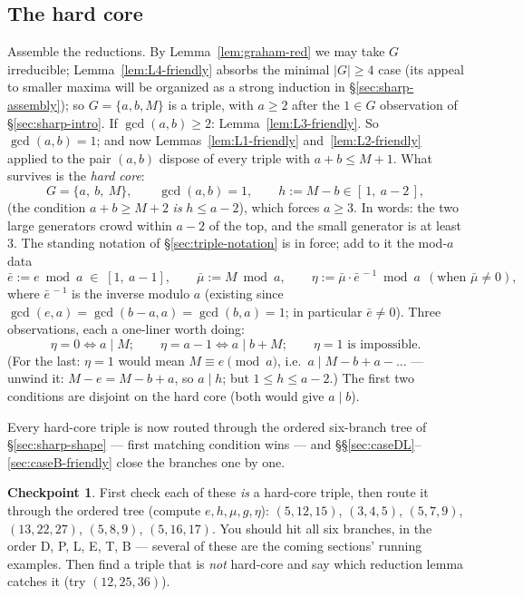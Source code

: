 \documentclass[11pt,reqno]{amsart}
\theoremstyle{plain}
\theoremstyle{definition}
\newtheorem{checkpoint}[theorem]{Checkpoint}   %
\theoremstyle{remark}
\begin{document}
\subsection{The hard core}\label{sec:hardcore-friendly}

Assemble the reductions. By Lemma~\ref{lem:graham-red} we may take $G$
irreducible; Lemma~\ref{lem:L4-friendly} absorbs the minimal $|G| \ge 4$ case (its
appeal to smaller maxima will be organized as a strong induction in
\S\ref{sec:sharp-assembly}); so $G = \{a, b, M\}$ is a triple, with $a \ge 2$
after the $1 \in G$ observation of \S\ref{sec:sharp-intro}. If $\gcd(a,b) \ge 2$:
Lemma~\ref{lem:L3-friendly}. So $\gcd(a, b) = 1$; and now Lemmas~\ref{lem:L1-friendly}
and~\ref{lem:L2-friendly} applied to the pair $(a, b)$ dispose of every triple with
$a + b \le M + 1$. What survives is the \emph{hard core}:
\[
  G = \{a,\ b,\ M\}, \qquad \gcd(a, b) = 1, \qquad
  h := M - b \in [\,1,\ a - 2\,] ,
\]
(the condition $a + b \ge M + 2$ \emph{is} $h \le a - 2$), which forces $a \ge 3$.
In words: the two large generators crowd within $a - 2$ of the top, and the small
generator is at least $3$. The standing notation of
\S\ref{sec:triple-notation} is in force; add to it the mod-$a$ data
\[
  \bar e := e \bmod a \;\in\; [1,\ a-1], \qquad
  \bar\mu := M \bmod a, \qquad
  \eta := \bar\mu \cdot \bar e^{\,-1} \bmod a \ \ (\text{when } \bar\mu \neq 0),
\]
where $\bar e^{\,-1}$ is the inverse modulo $a$ (existing since $\gcd(e, a) =
\gcd(b - a, a) = \gcd(b, a) = 1$; in particular $\bar e \ne 0$). Three
observations, each a one-liner worth doing:
\[
  \eta = 0 \iff a \mid M; \qquad
  \eta = a - 1 \iff a \mid b + M; \qquad
  \eta = 1 \text{ is impossible} .
\]
(For the last: $\eta = 1$ would mean $M \equiv e \pmod a$, i.e.\ $a \mid M - b + a
- \dots$ --- unwind it: $M - e = M - b + a$, so $a \mid h$; but $1 \le h \le a-2$.)
The first two conditions are disjoint on the hard core (both would give $a \mid
b$).

Every hard-core triple is now routed through the ordered six-branch tree of
\S\ref{sec:sharp-shape} --- first matching condition wins --- and
\S\S\ref{sec:caseDL}--\ref{sec:caseB-friendly} close the branches one by one.

\begin{checkpoint}
First check each of these \emph{is} a hard-core triple, then route it through the
ordered tree (compute $e, h, \mu, g, \eta$): $(5,12,15)$, $(3,4,5)$, $(5,7,9)$,
$(13,22,27)$, $(5,8,9)$, $(5,16,17)$. You should hit all six branches, in the
order D, P, L, E, T, B --- several of these are the coming sections' running
examples. Then find a triple that is \emph{not} hard-core and say which reduction
lemma catches it (try $(12, 25, 36)$).
\end{checkpoint}
\end{document}
